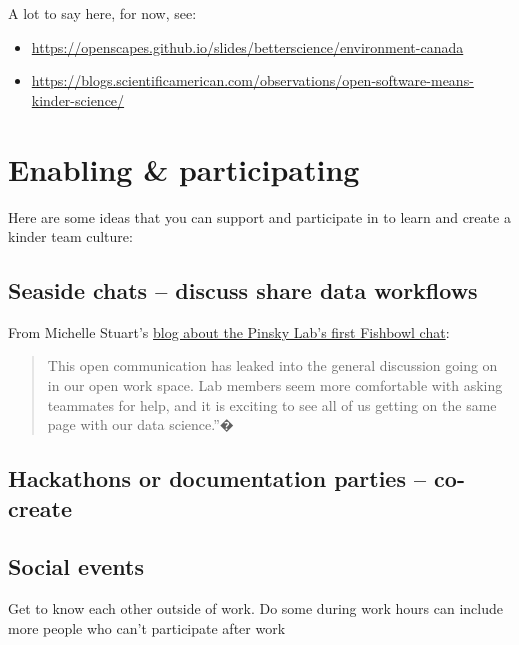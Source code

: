 \documentclass[
  letterpaper,
  DIV=11,
  numbers=noendperiod]{scrreprt}
\providecommand{\tightlist}{%
  \setlength{\itemsep}{0pt}\setlength{\parskip}{0pt}}
\begin{document}
A lot to say here, for now, see:

\begin{itemize}
\tightlist
\item
  \url{https://openscapes.github.io/slides/betterscience/environment-canada}
\item
  \url{https://blogs.scientificamerican.com/observations/open-software-means-kinder-science/}
\end{itemize}

\hypertarget{enabling-participating}{%
\section{Enabling \& participating}\label{enabling-participating}}

Here are some ideas that you can support and participate in to learn and
create a kinder team culture:

\hypertarget{seaside-chats-discuss-share-data-workflows}{%
\subsection{Seaside chats -- discuss share data
workflows}\label{seaside-chats-discuss-share-data-workflows}}

From Michelle Stuart's
\href{http://pinsky.marine.rutgers.edu/fishbowl-chat-1/}{blog about the
Pinsky Lab's first Fishbowl chat}:

\begin{quote}
This open communication has leaked into the general discussion going on
in our open work space. Lab members seem more comfortable with asking
teammates for help, and it is exciting to see all of us getting on the
same page with our data science.''�
\end{quote}

\hypertarget{hackathons-or-documentation-parties-co-create}{%
\subsection{Hackathons or documentation parties --
co-create}\label{hackathons-or-documentation-parties-co-create}}

\hypertarget{social-events}{%
\subsection{Social events}\label{social-events}}

Get to know each other outside of work. Do some during work hours can
include more people who can't participate after work
\end{document}
